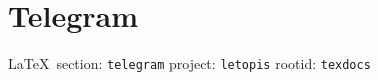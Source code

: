  
 
\chapter{Telegram}

\vspace{0.5cm}
 {\ifDEBUG\small\LaTeX~section: \verb|telegram| project: \verb|letopis| rootid: \verb|texdocs|	\fi}
\vspace{0.5cm}


